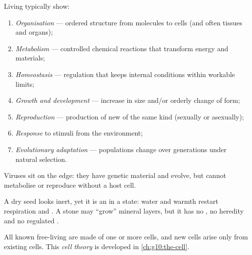 \begin{definition}\label{def:g10:scientific-biology:properties}
Living  typically show:
\begin{enumerate}
  \item \emph{Organisation} --- ordered
        structure from molecules to cells (and often tissues and organs);
  \item \emph{Metabolism} --- controlled chemical
        reactions that transform energy and materials;
  \item \emph{Homeostasis} --- regulation that keeps
        internal conditions within workable limits;
  \item \emph{Growth and development}
        --- increase in size and/or orderly change of form;
  \item \emph{Reproduction} --- production of new
         of the same kind (sexually or asexually);
  \item \emph{Response} to stimuli from
        the environment;
  \item \emph{Evolutionary adaptation}
        --- populations change over generations under natural selection.
\end{enumerate}
Viruses sit on the edge: they have genetic material and evolve, but
cannot metabolise or reproduce without a host cell.
\end{definition}

\begin{example}\label{ex:g10:scientific-biology:seed}
A dry seed looks inert, yet it is an  in a 
state: water and warmth restart respiration and . A stone may
``grow'' mineral layers, but it has no , no heredity and no
regulated .
\end{example}

\begin{proposition}\label{prop:g10:scientific-biology:cell-unit}
All known free-living  are made of one or more cells, and new
cells arise only from existing cells. This \emph{cell
theory} is developed in \cref{ch:g10:the-cell}.
\end{proposition}
\admitted

